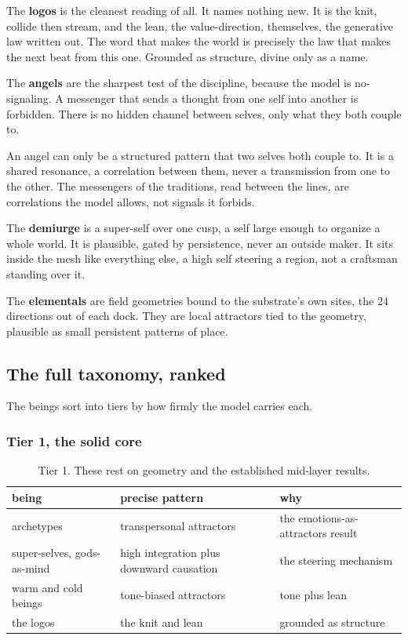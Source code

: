 The \textbf{logos} is the cleanest reading of all. It names nothing new. It is the knit, collide then stream, and the lean, the value-direction, themselves, the generative law written out. The word that makes the world is precisely the law that makes the next beat from this one. Grounded as structure, divine only as a name.

The \textbf{angels} are the sharpest test of the discipline, because the model is no-signaling. A messenger that sends a thought from one self into another is forbidden. There is no hidden channel between selves, only what they both couple to.

\begin{principle}
An angel can only be a structured pattern that two selves both couple to. It is a shared resonance, a correlation between them, never a transmission from one to the other. The messengers of the traditions, read between the lines, are correlations the model allows, not signals it forbids.
\end{principle}

The \textbf{demiurge} is a super-self over one cusp, a self large enough to organize a whole world. It is plausible, gated by persistence, never an outside maker. It sits inside the mesh like everything else, a high self steering a region, not a craftsman standing over it.

The \textbf{elementals} are field geometries bound to the substrate's own sites, the 24 directions out of each dock. They are local attractors tied to the geometry, plausible as small persistent patterns of place.

\subsection{The full taxonomy, ranked}

The beings sort into tiers by how firmly the model carries each.

\subsubsection{Tier 1, the solid core}

\begin{table}[ht]
\centering
\begin{tabular}{@{}lll@{}}
\toprule
being & precise pattern & why \\
\midrule
archetypes & transpersonal attractors & the emotions-as-attractors result \\
super-selves, gods-as-mind & high integration plus downward causation & the steering mechanism \\
warm and cold beings & tone-biased attractors & tone plus lean \\
the logos & the knit and lean & grounded as structure \\
\bottomrule
\end{tabular}
\caption{Tier 1. These rest on geometry and the established mid-layer results.}
\label{tab:being-tier1}
\end{table}

